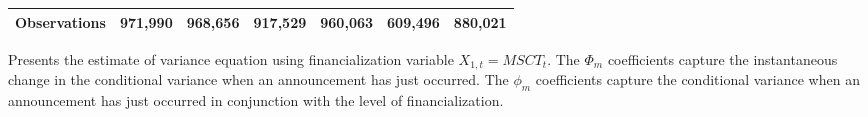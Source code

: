 \begin{landscape}
\begin{table}[]
{\begin{tabular}{lllllllllllll}
Observations &
  \multicolumn{2}{c}{971,990} &
  \multicolumn{2}{c}{968,656} &
  \multicolumn{2}{c}{917,529} &
  \multicolumn{2}{c}{960,063} &
  \multicolumn{2}{c}{609,496} &
  \multicolumn{2}{c}{880,021} \\ \hline
\end{tabular}%
}
 \singlespacing
        \footnotesize
    Presents the estimate of variance equation using financialization variable $X_{1,t}=MSCT_t$. The $\Phi_m$ coefficients capture the instantaneous change in the conditional variance when an announcement has just occurred. The $\phi_m$ coefficients capture the conditional variance when an announcement has just occurred in conjunction with the level of financialization.
\end{table}
\end{landscape}

